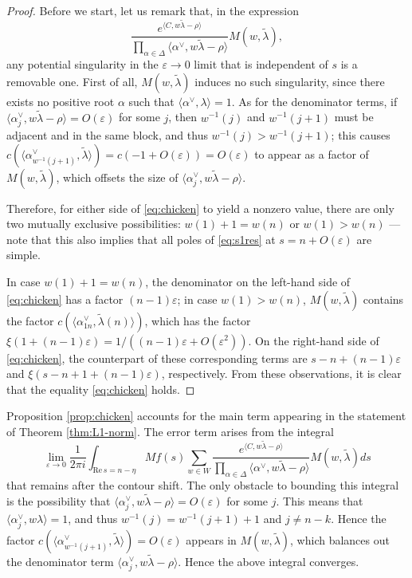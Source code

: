 \documentclass[11pt]{amsart}
\numberwithin{theorem}{section}
\numberwithin{equation}{section}
\theoremstyle{remark}
\theoremstyle{definition}
\newcommand{\re}{\mathrm{Re}\,}
\begin{document}
\begin{proof}
Before we start, let us remark that, in the expression
\begin{equation*}
\frac{e^{\langle C, w\tilde\lambda-\rho\rangle}}{\prod_{\alpha \in \Delta} \langle \alpha^\vee, w\tilde\lambda-\rho \rangle}M(w,\tilde\lambda),
\end{equation*}
any potential singularity in the $\varepsilon\rightarrow0$ limit that is independent of $s$ is a removable one. First of all, $M(w,\tilde\lambda)$ induces no such singularity, since there exists no positive root $\alpha$ such that $\langle \alpha^\vee, \lambda\rangle = 1$. As for the denominator terms, if $\langle \alpha^\vee_j,w\tilde\lambda-\rho\rangle = O(\varepsilon)$ for some $j$, then $w^{-1}(j)$ and $w^{-1}(j+1)$ must be adjacent and in the same block, and thus $w^{-1}(j) > w^{-1}(j+1)$; this causes $c(\langle \alpha^\vee_{w^{-1}(j+1)},\tilde\lambda\rangle)= c(-1+O(\varepsilon)) = O(\varepsilon)$ to appear as a factor of $M(w,\tilde\lambda)$, which offsets the size of $\langle \alpha^\vee_j,w\tilde\lambda-\rho\rangle$.

Therefore, for either side of \eqref{eq:chicken} to yield a nonzero value, there are only two mutually exclusive possibilities: $w(1)+1=w(n)$ or $w(1) > w(n)$ --- note that this also implies that all poles of \eqref{eq:s1res} at $s=n+O(\varepsilon)$ are simple.

In case $w(1)+1=w(n)$, the denominator on the left-hand side of \eqref{eq:chicken} has a factor $(n-1)\varepsilon$; in case $w(1) > w(n)$, $M(w,\tilde\lambda)$ contains the factor $c(\langle \alpha^\vee_{1n},\tilde\lambda(n)\rangle)$, which has the factor $\xi(1+(n-1)\varepsilon)=1/((n-1)\varepsilon+O(\varepsilon^2))$. On the right-hand side of \eqref{eq:chicken}, the counterpart of these corresponding terms are $s-n+(n-1)\varepsilon$ and $\xi(s-n+1+(n-1)\varepsilon)$, respectively. From these observations, it is clear that the equality \eqref{eq:chicken} holds.
\end{proof}

Proposition \ref{prop:chicken} accounts for the main term appearing in the statement of Theorem \ref{thm:L1-norm}. The error term arises from the integral
\begin{equation}\label{eq:L1error}
\lim_{\varepsilon\rightarrow0} \frac{1}{2\pi i}\int_{\re s = n-\eta} Mf(s)\sum_{w \in W} \frac{e^{\langle C, w\tilde\lambda-\rho\rangle}}{\prod_{\alpha \in \Delta} \langle\alpha^\vee,w\tilde\lambda-\rho\rangle}M(w,\tilde\lambda)ds
\end{equation}
that remains after the contour shift. The only obstacle to bounding this integral is the possibility that $\langle \alpha^\vee_j, w\tilde\lambda-\rho \rangle = O(\varepsilon)$ for some $j$. This means that $\langle \alpha^\vee_j,w\lambda\rangle = 1$, and thus $w^{-1}(j) = w^{-1}(j+1)+1$ and $j\neq n-k$. Hence the factor $c(\langle \alpha^\vee_{w^{-1}(j+1)},\tilde\lambda \rangle) = O(\varepsilon)$ appears in $M(w,\tilde\lambda)$, which balances out the denominator term $\langle \alpha^\vee_j, w\tilde\lambda-\rho \rangle$. Hence the above integral converges.
\end{document}
